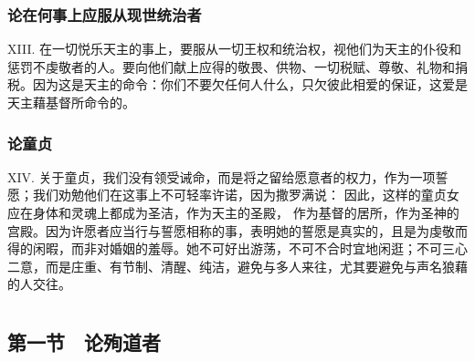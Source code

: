 
\subsubsection{论在何事上应服从现世统治者}

XIII. 在一切悦乐天主的事上，要服从一切王权和统治权，视他们为天主的仆役和惩罚不虔敬者的人。要向他们献上应得的敬畏、供物、一切税赋、尊敬、礼物和捐税。因为这是天主的命令：你们不要欠任何人什么，只欠彼此相爱的保证，这爱是天主藉基督所命令的。\par


\subsubsection{论童贞}

XIV. 关于童贞，我们没有领受诫命，而是将之留给愿意者的权力，作为一项誓愿；我们劝勉他们在这事上不可轻率许诺，因为撒罗满说：  因此，这样的童贞女应在身体和灵魂上都成为圣洁，作为天主的圣殿， 作为基督的居所，作为圣神的宫殿。因为许愿者应当行与誓愿相称的事，表明她的誓愿是真实的，且是为虔敬而得的闲暇，而非对婚姻的羞辱。她不可好出游荡，不可不合时宜地闲逛；不可三心二意，而是庄重、有节制、清醒、纯洁，避免与多人来往，尤其要避免与声名狼藉的人交往。\par



\section{}


\subsection{第一节　论殉道者}


